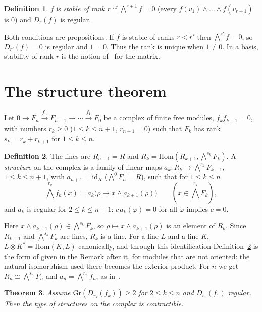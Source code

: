 \documentclass[11pt]{amsart}
\newtheorem{theorem}{Theorem}
\theoremstyle{definition}
\newtheorem{definition}[theorem]{Definition}
\theoremstyle{remark}
\newcommand{\Gr}{\mathrm{Gr}}
\newcommand{\Hom}{\mathrm{Hom}}
\newcommand{\Ex}{{\textstyle\bigwedge}}
\begin{document}
\begin{definition}
$f$ is \emph{stable of rank $r$} if $\Ex^{r+1}f=0$ (every
$f(v_1)\wedge\dots\wedge f(v_{r+1})$ is $0$) and $D_r(f)$ is regular.
\end{definition}

Both conditions are propositions.  If $f$ is stable of ranks $r<r'$ then
$\Ex^{r'}f=0$, so $D_{r'}(f)=0$ is regular and $1=0$.  Thus the rank is
unique when $1\neq0$.  In a basis, stability of rank $r$ is the notion
of~\cite[Section~2]{CQ} for the matrix.

\section{The structure theorem}

Let $0\to F_n\xrightarrow{f_n}F_{n-1}\to\cdots\xrightarrow{f_1}F_0$ be a
complex of finite free modules, $f_kf_{k+1}=0$, with numbers $r_k\geq0$
($1\le k\le n+1$, $r_{n+1}=0$) such that $F_k$ has rank $s_k=r_k+r_{k+1}$
for $1\le k\le n$.

\begin{definition}\label{def:structure}
The lines are $R_{n+1}=R$ and $R_k=\Hom(R_{k+1},\Ex^{s_k}F_k)$.  A
\emph{structure} on the complex is a family of linear maps
$a_k:R_k\to\Ex^{r_k}F_{k-1}$, $1\leq k\leq n+1$, with
$a_{n+1}=\mathrm{id}_R$ ($\Ex^0F_n=R$), such that for $1\leq k\leq n$
\begin{equation}\label{eq:star}
\Ex^{r_k}f_k(x)=a_k\bigl(\rho\mapsto x\wedge a_{k+1}(\rho)\bigr)
\qquad(x\in\Ex^{r_k}F_k),\tag{$*$}
\end{equation}
and $a_k$ is regular for $2\le k\le n+1$: $c\,a_k(\varphi)=0$ for all
$\varphi$ implies $c=0$.
\end{definition}

Here $x\wedge a_{k+1}(\rho)\in\Ex^{s_k}F_k$, so
$\rho\mapsto x\wedge a_{k+1}(\rho)$ is an element of $R_k$.  Since
$R_{k+1}$ and $\Ex^{s_k}F_k$ are lines, $R_k$ is a line.  For a line
$L$ and a line $K$, $L\otimes K^*=\Hom(K,L)$ canonically, and through this
identification Definition~\ref{def:structure} is the form of
\cite[Theorem~3.1(a)]{BE74} given in the Remark after it, for modules
that are not oriented: the natural isomorphism used there becomes the
exterior product.  For $n$ we get $R_n\cong\Ex^{s_n}F_n$ and
$a_n=\Ex^{r_n}f_n$, as in~\cite{BE74}.

\begin{theorem}\label{thm:structure}
Assume $\Gr(D_{r_k}(f_k))\geq2$ for $2\leq k\leq n$ and $D_{r_1}(f_1)$
regular.  Then the type of structures on the complex is contractible.
\end{theorem}
\end{document}
